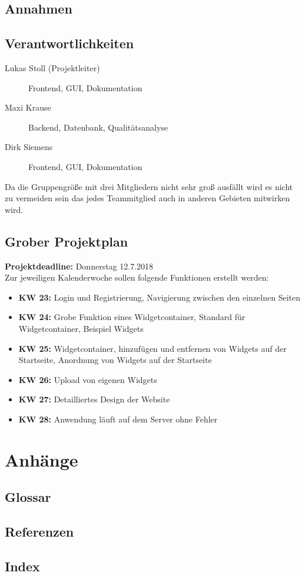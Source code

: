 	\subsection{Annahmen}
	
	\subsection{Verantwortlichkeiten}
		\begin{description}
			\item[Lukas Stoll (Projektleiter)] Frontend, GUI, Dokumentation
			\item[Maxi Krause] Backend, Datenbank, Qualitätsanalyse
			\item[Dirk Siemens] Frontend, GUI, Dokumentation
		\end{description}
		Da die Gruppengröße mit drei Mitgliedern nicht sehr groß ausfällt wird es nicht zu vermeiden sein das jedes Teammitglied auch in anderen Gebieten mitwirken wird. 
	
	\subsection{Grober Projektplan}
		\textbf{Projektdeadline: } Donnerstag 12.7.2018 \\
		Zur jeweiligen Kalenderwoche sollen folgende Funktionen erstellt werden: 
		\begin{itemize}
			\item \textbf{KW 23: }Login und Registrierung, Navigierung zwischen den einzelnen Seiten 
			\item \textbf{KW 24: }Grobe Funktion eines Widgetcontainer, Standard für Widgetcontainer, Beispiel Widgets  
			\item \textbf{KW 25: }Widgetcontainer, hinzufügen und entfernen von Widgets auf der Startseite, Anordnung von Widgets auf der Startseite   
			\item \textbf{KW 26: }Upload von eigenen Widgets
			\item \textbf{KW 27: }Detailliertes Design der Website 
			\item \textbf{KW 28: }Anwendung läuft auf dem Server ohne Fehler
		\end{itemize}
		
		
	

\section{Anhänge}

	\subsection{Glossar}
	
	\subsection{Referenzen}
	
	\subsection{Index}